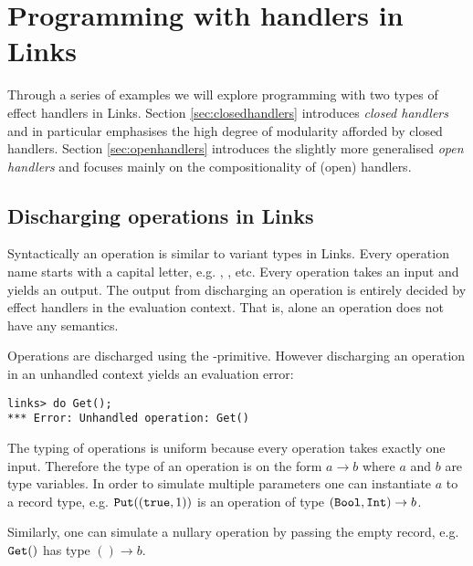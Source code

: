 \chapter{Programming with handlers in Links}\label{ch:programming}
Through a series of examples we will explore programming with two types of effect handlers in Links. Section \ref{sec:closedhandlers} introduces \emph{closed handlers} and in particular emphasises the high degree of modularity afforded by closed handlers. Section \ref{sec:openhandlers} introduces the slightly more generalised \emph{open handlers} and focuses mainly on the compositionality of (open) handlers.

\section{Discharging operations in Links}\label{sec:discharge}
Syntactically an operation is similar to variant types in Links. Every operation name starts with a capital letter, e.g. , , etc. Every operation takes an input and yields an output. The output from discharging an operation is entirely decided by effect handlers in the evaluation context. That is, alone an operation does not have any semantics.

Operations are discharged using the -primitive. However discharging an operation in an unhandled context yields an evaluation error:
\begin{lstlisting}[style=links]
links> do Get();
*** Error: Unhandled operation: Get()
\end{lstlisting}
The typing of operations is uniform because every operation takes exactly one input. Therefore the type of an operation is on the form $a \to b$ where $a$ and $b$ are type variables. In order to simulate multiple parameters one can instantiate $a$ to a record type, e.g. $\texttt{Put}((\texttt{true},1))$ is an operation of type $(\texttt{Bool},\texttt{Int}) \to b$.

Similarly, one can simulate a nullary operation by passing the empty record, e.g. $\texttt{Get}()$ has type $() \to b$.
